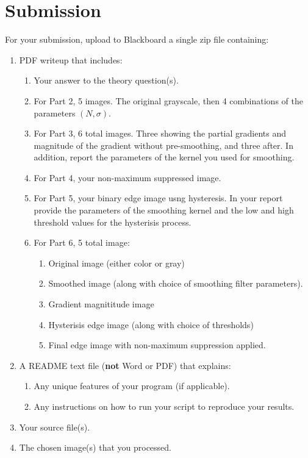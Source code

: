 \documentclass[12pt]{article}
\begin{document}
\newpage
\section*{Submission}
For your submission, upload to Blackboard a single zip file containing:

\begin{enumerate}
\item PDF writeup that includes:
\begin{enumerate}
\item Your answer to the theory question(s).
\item For Part 2, 5 images.  The original grayscale, then 4 combinations of the parameters $(N,\sigma)$.
\item For Part 3, 6 total images.  Three showing the partial gradients and magnitude of the gradient without pre-smoothing, and three after.  In addition, report the parameters of the kernel you used for smoothing.
\item For Part 4, your non-maximum suppressed image.
\item For Part 5, your binary edge image usng hysteresis.  In your report provide the parameters of the smoothing kernel and the low and high threshold values for the hysterisis process.
\item For Part 6, 5 total image:
	\begin{enumerate}
	\item Original image (either color or gray)
	\item Smoothed image (along with choice of smoothing filter parameters).
	\item Gradient magnititude image
	\item Hysterisis edge image (along with choice of thresholds)
	\item Final edge image with non-maximum suppression applied.
	\end{enumerate}
\end{enumerate}
\item A README text file (\textbf{not} Word or PDF) that explains:
\begin{enumerate}
\item Any unique features of your program (if applicable).
\item Any instructions on how to run your script to reproduce your results.
\end{enumerate}
\item Your source file(s).
\item The chosen image(s) that you processed.
\end{enumerate}
\end{document}
